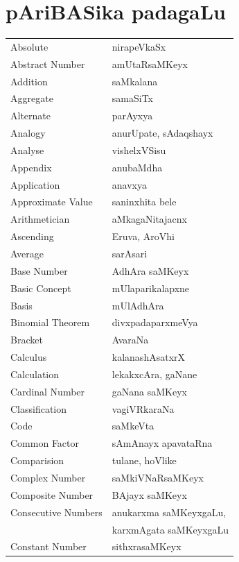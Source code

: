 \eject
\section*{\hspace{3.5cm}pAriBASika padagaLu}


\begin{longtable}{>{\rm}l@{\hspace{1.25cm}}l}
Absolute & nirapeVkaSx\\
Abstract Number & amUtaRsaMKeyx\\
Addition & saMkalana\\
Aggregate & samaSiTx\\
Alternate & parAyxya\\
Analogy & anurUpate, sAdaqshayx\\
Analyse & vishelxVSisu\\
Appendix & anubaMdha\\
Application & anavxya \\
Approximate Value & saninxhita bele\\
Arithmetician & aMkagaNitajacnx\\
Ascending & Eruva, AroVhi\\
Average & sarAsari \\
Base Number & AdhAra saMKeyx\\
Basic Concept & mUlaparikalapxne\\
Basis & mUlAdhAra \\
Binomial Theorem & divxpadaparxmeVya\\
Bracket & AvaraNa\\
Calculus & kalanashAsatxrX\\
Calculation & lekakxcAra, gaNane\\
Cardinal Number & gaNana saMKeyx\\
Classification & vagiVRkaraNa\\
Code & saMkeVta\\
Common Factor & sAmAnayx apavataRna\\
Comparision & tulane, hoVlike\\
Complex Number & saMkiVNaRsaMKeyx\\
Composite Number & BAjayx saMKeyx\\
Consecutive Numbers & anukarxma saMKeyxgaLu,\\
                    & karxmAgata saMKeyxgaLu\\
Constant Number & sithxrasaMKeyx\\

\end{longtable}
